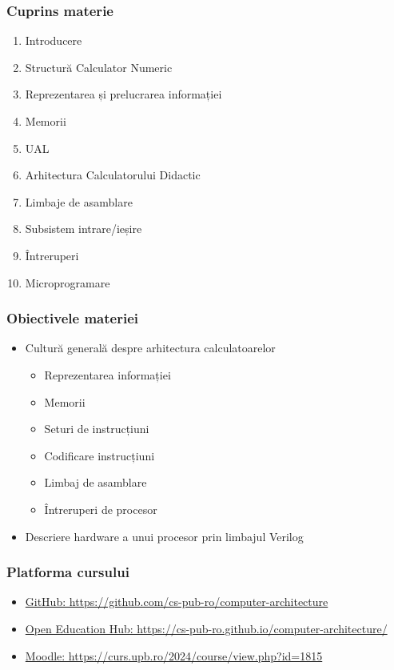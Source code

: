 \begin{frame}
    \frametitle{Cuprins materie}
    \begin{enumerate}
        \setcounter{enumi}{0}
        \item Introducere
        \item Structură Calculator Numeric
        \item Reprezentarea și prelucrarea informației
        \item Memorii
        \item UAL
        \item Arhitectura Calculatorului Didactic
        \item Limbaje de asamblare
        \item Subsistem intrare/ieșire
        \item Întreruperi
        \item Microprogramare
    \end{enumerate}
\end{frame}
    
\begin{frame}
    \frametitle{Obiectivele materiei}
    
    \begin{itemize}
        \item Cultură generală despre arhitectura calculatoarelor
        \begin{itemize}
            \item Reprezentarea informației
            \item Memorii
            \item Seturi de instrucțiuni
            \item Codificare instrucțiuni
            \item Limbaj de asamblare
            \item Întreruperi de procesor
        \end{itemize}
        \item Descriere hardware a unui procesor prin limbajul Verilog
    \end{itemize}
\end{frame}




\begin{frame}
    \frametitle{Platforma cursului}
    
    \begin{itemize}
        \item \href{https://github.com/cs-pub-ro/computer-architecture}{GitHub: https://github.com/cs-pub-ro/computer-architecture}
        \item \href{https://cs-pub-ro.github.io/computer-architecture/}{Open Education Hub: https://cs-pub-ro.github.io/computer-architecture/}
        \item \href{https://curs.upb.ro/2024/course/view.php?id=1815}{Moodle: https://curs.upb.ro/2024/course/view.php?id=1815}
    \end{itemize}
\end{frame}